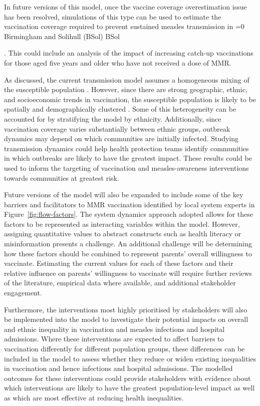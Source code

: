 \documentclass[12pt]{article}
\newcounter{bsol}
\newcommand{\bsol}{%
    \ifnum\value{bsol}=0
        \stepcounter{bsol}%
        Birmingham and Solihull (BSol)%
        \else
        BSol%
    \fi%
    \xspace
}
\newcounter{who}
\begin{document}
In future versions of this model, once the vaccine coverage overestimation issue has been resolved, simulations of this type can be used to estimate the vaccination coverage required to prevent sustained measles transmission in \bsol. This could include an analysis of the impact of increasing catch-up vaccinations for those aged five years and older who have not received a dose of MMR.

As discussed, the current transmission model assumes a homogeneous mixing of the susceptible population \cite{bjornstad2020seirs}. However, since there are strong geographic, ethnic, and socioeconomic trends in vaccination, the susceptible population is likely to be spatially and demographically clustered \cite{jary2025sociodemographic}. Some of this heterogeneity can be accounted for by stratifying the model by ethnicity. Additionally, since vaccination coverage varies substantially between ethnic groups, outbreak dynamics may depend on which communities are initially infected. Studying transmission dynamics  could help health protection teams identify communities in which outbreaks are likely to have the greatest impact. These results could be used to inform the targeting of vaccination and measles-awareness interventions towards communities at greatest risk.

Future versions of the model will also be expanded to include some of the key barriers and facilitators to MMR vaccination identified by local system experts in Figure~\ref{fig:flow-factors}. The system dynamics approach adopted allows for these factors to be represented as interacting variables within the model. However, assigning quantitative values to abstract constructs such as health literacy or misinformation presents a challenge. An additional challenge will be determining how these factors should be combined to represent parents' overall willingness to vaccinate. Estimating the current values for each of these factors and their relative influence on parents' willingness to vaccinate will require further reviews of the literature, empirical data where available, and additional stakeholder engagement. 

Furthermore, the interventions most highly prioritised by stakeholders will also be implemented into the model to investigate their potential impacts on overall and ethnic inequality in vaccination and measles infections and hospital admissions. Where these interventions are expected to affect barriers to vaccination differently for different population groups, these differences can be included in the model to assess whether they reduce or widen existing inequalities in vaccination and hence infections and hospital admissions. The modelled outcomes for these interventions could provide stakeholders with evidence about which interventions are likely to have the greatest population-level impact as well as which are most effective at reducing health inequalities. 
\end{document}
